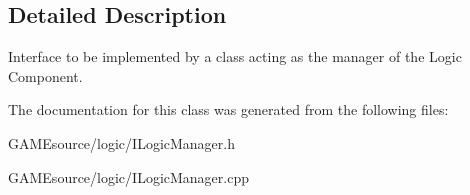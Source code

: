 \subsection{Detailed Description}
Interface to be implemented by a class acting as the manager of the Logic Component. 

The documentation for this class was generated from the following files\+:\begin{DoxyCompactItemize}
\item 
G\+A\+M\+Esource/logic/I\+Logic\+Manager.\+h\item 
G\+A\+M\+Esource/logic/I\+Logic\+Manager.\+cpp\end{DoxyCompactItemize}
